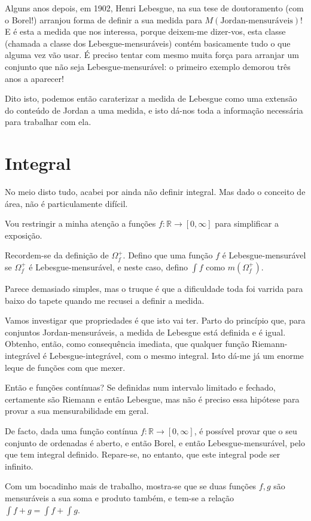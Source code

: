 \documentclass{article}
\newcommand{\R}{\mathbb{R}}
\begin{document}
Alguns anos depois, em 1902, Henri Lebesgue, na sua tese de doutoramento (com o Borel!) arranjou forma de definir a sua medida para $M(\text{Jordan-mensuráveis})$! E é esta a medida que nos interessa, porque deixem-me dizer-vos, esta classe (chamada a classe dos Lebesgue-mensuráveis) contém basicamente tudo o que alguma vez vão usar. É preciso tentar com mesmo muita força para arranjar um conjunto que não seja Lebesgue-mensurável: o primeiro exemplo demorou três anos a aparecer!

Dito isto, podemos então caraterizar a medida de Lebesgue como uma extensão do conteúdo de Jordan a uma medida, e isto dá-nos toda a informação necessária para trabalhar com ela.

\section{Integral}

No meio disto tudo, acabei por ainda não definir integral. Mas dado o conceito de área, não é particulamente difícil.

Vou restringir a minha atenção a funções $f : \R \to [0, \infty]$ para simplificar a exposição.

Recordem-se da definição de $\Omega^+_f$. Defino que uma função $f$ é Lebesgue-mensurável se $\Omega^+_f$ é Lebesgue-mensurável, e neste caso, defino $\int f$ como $m(\Omega^+_f)$.

Parece demasiado simples, mas o truque é que a dificuldade toda foi varrida para baixo do tapete quando me recusei a definir a medida.

Vamos investigar que propriedades é que isto vai ter. Parto do princípio que, para conjuntos Jordan-mensuráveis, a medida de Lebesgue está definida e é igual. Obtenho, então, como consequência imediata, que qualquer função Riemann-integrável é Lebesgue-integrável, com o mesmo integral. Isto dá-me já um enorme leque de funções com que mexer.

Então e funções contínuas? Se definidas num intervalo limitado e fechado, certamente são Riemann e então Lebesgue, mas não é preciso essa hipótese para provar a sua mensurabilidade em geral.

De facto, dada uma função contínua $f : \R \to [0, \infty]$, é possível provar que o seu conjunto de ordenadas é aberto, e então Borel, e então Lebesgue-mensurável, pelo que tem integral definido. Repare-se, no entanto, que este integral pode ser infinito.

Com um bocadinho mais de trabalho, mostra-se que se duas funções $f, g$ são mensuráveis a sua soma e produto também, e tem-se a relação $\int f + g = \int f + \int g$.
\end{document}
